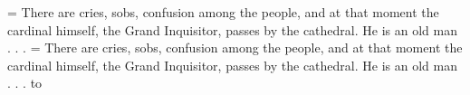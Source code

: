 \def\tstoryA{There are cries, sobs, confusion among the people, and at
that moment the cardinal himself, the Grand Inquisitor, passes by the
cathedral. He is an old man . . .}
{}
=\vbox{\hsize=2.25in \tstoryA}
=\vbox{\hsize=2.25in \tstoryA}
\hbox to 
\bye
